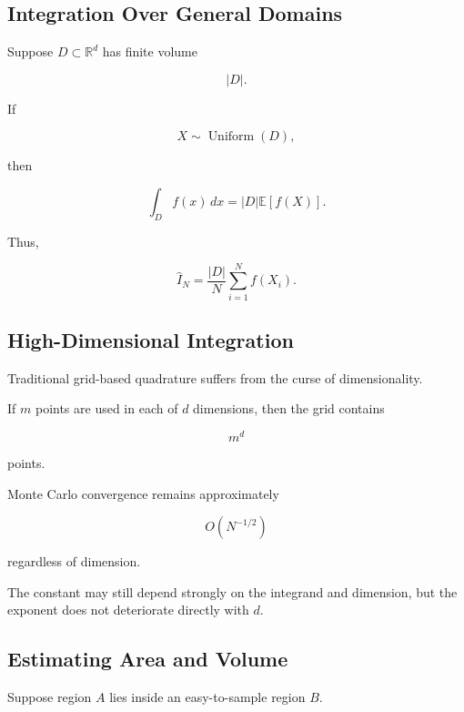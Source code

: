 \subsection{Integration Over General Domains}
\label{subsec:mc-general-domain-integration}

Suppose \(D\subset\mathbb{R}^d\) has finite volume

\[
|D|.
\]

If

\[
X\sim\operatorname{Uniform}(D),
\]

then

\[
\boxed{
\int_D
f(x)\,dx
=
|D|
\mathbb{E}[f(X)].
}
\]

Thus,

\[
\boxed{
\widehat{I}_N
=
\frac{
|D|
}{
N
}
\sum_{i=1}^{N}
f(X_i).
}
\]

\subsection{High-Dimensional Integration}
\label{subsec:mc-high-dimensional-integration}

Traditional grid-based quadrature suffers from the curse of
dimensionality.

If \(m\) points are used in each of \(d\) dimensions, then the grid
contains

\[
\boxed{
m^d
}
\]

points.

Monte Carlo convergence remains approximately

\[
\boxed{
O(N^{-1/2})
}
\]

regardless of dimension.

The constant may still depend strongly on the integrand and dimension, but
the exponent does not deteriorate directly with \(d\).

\subsection{Estimating Area and Volume}
\label{subsec:mc-area-volume}

Suppose region \(A\) lies inside an easy-to-sample region \(B\).

